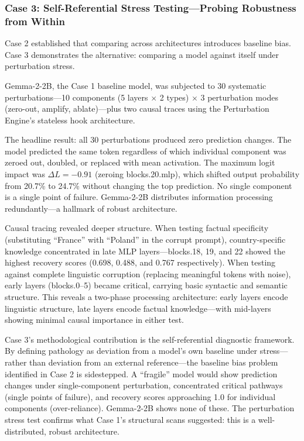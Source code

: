 \documentclass[11pt]{article}
\begin{document}
\subsubsection{Case 3: Self-Referential Stress Testing---Probing Robustness from Within}

Case 2 established that comparing across architectures introduces baseline bias. Case 3 demonstrates the alternative: comparing a model against itself under perturbation stress.

Gemma-2-2B, the Case 1 baseline model, was subjected to 30 systematic perturbations---10 components (5 layers $\times$ 2 types) $\times$ 3 perturbation modes (zero-out, amplify, ablate)---plus two causal traces using the Perturbation Engine's stateless hook architecture.

The headline result: all 30 perturbations produced zero prediction changes. The model predicted the same token regardless of which individual component was zeroed out, doubled, or replaced with mean activation. The maximum logit impact was $\Delta L = -0.91$ (zeroing blocks.20.mlp), which shifted output probability from 20.7\% to 24.7\% without changing the top prediction. No single component is a single point of failure. Gemma-2-2B distributes information processing redundantly---a hallmark of robust architecture.

Causal tracing revealed deeper structure. When testing factual specificity (substituting ``France'' with ``Poland'' in the corrupt prompt), country-specific knowledge concentrated in late MLP layers---blocks.18, 19, and 22 showed the highest recovery scores (0.698, 0.488, and 0.767 respectively). When testing against complete linguistic corruption (replacing meaningful tokens with noise), early layers (blocks.0--5) became critical, carrying basic syntactic and semantic structure. This reveals a two-phase processing architecture: early layers encode linguistic structure, late layers encode factual knowledge---with mid-layers showing minimal causal importance in either test.

Case 3's methodological contribution is the self-referential diagnostic framework. By defining pathology as deviation from a model's own baseline under stress---rather than deviation from an external reference---the baseline bias problem identified in Case 2 is sidestepped. A ``fragile'' model would show prediction changes under single-component perturbation, concentrated critical pathways (single points of failure), and recovery scores approaching 1.0 for individual components (over-reliance). Gemma-2-2B shows none of these. The perturbation stress test confirms what Case 1's structural scans suggested: this is a well-distributed, robust architecture.
\end{document}

